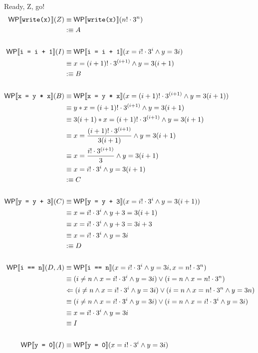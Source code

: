 \documentclass[
  english
]{tumteaching}
\begin{document}
\begin{assignment}[H, points=6]{Ready, Z, go!}
	\begin{align*}	
		\WP{write(x)}(Z)
		&\equiv \WP{write(x)}(n! \cdot 3^n)\\
		&\defequiv A		\\
		\\
		\WP{i = i + 1}(I) 
		&\equiv \WP{i = i + 1}(x = i! \cdot 3^i \land y = 3i) \\
		&\equiv x = (i+1)! \cdot 3^{(i+1)} \land y = 3(i+1) \\
		&\defequiv B \\
		\\	
		\WP{x = y * x}(B) 
		&\equiv \WP{x = y * x}(x = (i+1)! \cdot 3^{(i+1)} \land y = 3(i+1)) \\
		&\equiv y * x = (i+1)! \cdot 3^{(i+1)} \land y = 3(i+1) \\
		&\equiv 3(i+1) * x = (i+1)! \cdot 3^{(i+1)} \land y = 3(i+1) \\
		&\equiv x = \frac{(i+1)! \cdot 3^{(i+1)}}{3(i+1)} \land y = 3(i+1) \\
		&\equiv x = \frac{i! \cdot 3^{(i+1)}}{3} \land y = 3(i+1) \\
		&\equiv x = i! \cdot 3^i \land y = 3(i+1) \\
		&\defequiv C \\
		\\
		\WP{y = y + 3}(C) 
		&\equiv \WP{y = y + 3}(x = i! \cdot 3^i \land y = 3(i+1)) \\
		&\equiv x = i! \cdot 3^i \land y + 3 = 3(i+1) \\
		&\equiv x = i! \cdot 3^i \land y + 3 = 3i + 3 \\
		&\equiv x = i! \cdot 3^i \land y = 3i \\
		&\defequiv D \\
		\\
		\WP{i == n}(D, A)
		&\equiv \WP{i == n}(x = i! \cdot 3^i \land y = 3i, x = n! \cdot 3^n) \\
		&\equiv  (i \neq n \land x = i! \cdot 3^i \land y = 3i) \lor (i = n \land x = n! \cdot 3^n) \\
		&\Leftarrow  (i \neq n \land x = i! \cdot 3^i \land y = 3i) \lor (i = n \land x = n! \cdot 3^n \land y = 3n) \\
		&\equiv  (i \neq n \land x = i! \cdot 3^i \land y = 3i) \lor (i = n \land x = i! \cdot 3^i \land y = 3i) \\
		&\equiv  x = i! \cdot 3^i \land y = 3i \\
		&\equiv I \\
		\\
		\WP{y = 0}(I)
		&\equiv \WP{y = 0}(x = i! \cdot 3^i \land y = 3i) \\

\end{align*}
\end{assignment}
\end{document}

